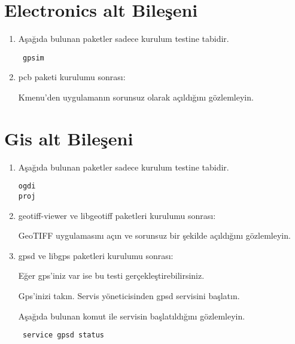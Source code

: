 \documentclass[a4paper,10pt]{article}
\begin{document}
\section{Electronics alt Bileşeni}
\begin{enumerate}
 \item Aşağıda bulunan paketler sadece kurulum testine tabidir.
\begin{verbatim}
 gpsim
\end{verbatim}
\item pcb paketi kurulumu sonrası:

Kmenu'den uygulamanın sorunsuz olarak açıldığını gözlemleyin.
\end{enumerate}


\section{Gis alt Bileşeni}
\begin{enumerate}
\item Aşağıda bulunan paketler sadece kurulum testine tabidir.
\begin{verbatim}
ogdi
proj
\end{verbatim}
\item geotiff-viewer ve libgeotiff paketleri kurulumu sonrası:

GeoTIFF uygulamasını açın ve sorunsuz bir şekilde açıldığını gözlemleyin.

\item gpsd ve libgps paketleri kurulumu sonrası:

Eğer gps'iniz var ise bu testi gerçekleştirebilirsiniz.

Gps'inizi takın. Servis yöneticisinden gpsd servisini başlatın.

Aşağıda bulunan komut ile servisin başlatıldığını gözlemleyin.
\begin{verbatim}
 service gpsd status
\end{verbatim}


\end{enumerate}
\end{document}
